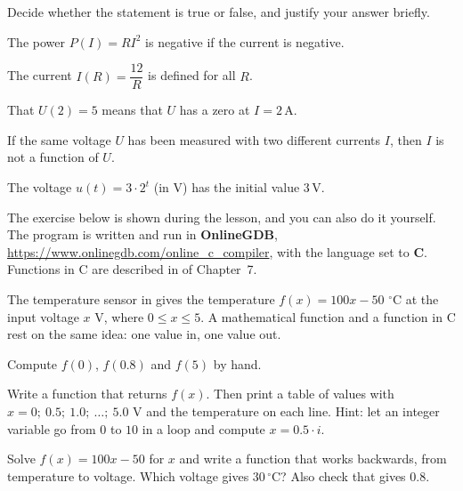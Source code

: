 Decide whether the statement is true or false, and justify your answer briefly.
\begin{parts}
  \item The power $P(I) = RI^2$ is negative if the current is negative.
  \item The current $I(R) = \dfrac{12}{R}$ is defined for all $R$.
  \item That $U(2) = 5$ means that $U$ has a zero at $I = 2\,\text{A}$.
  \item If the same voltage $U$ has been measured with two different currents $I$, then $I$ is not a
    function of $U$.
  \item The voltage $u(t) = 3 \cdot 2^t$ (in V) has the initial value $3\,\text{V}$.
\end{parts}

The exercise below is shown during the lesson, and you can also do it yourself. The program is
written and run in \textbf{OnlineGDB}, \url{https://www.onlinegdb.com/online_c_compiler}, with the
language set to \textbf{C}. Functions in C are described in  of Chapter~7.

The temperature sensor in  gives the temperature $f(x) = 100x - 50$
$^{\circ}$C at the input voltage $x$ V, where $0 \leq x \leq 5$. A mathematical function and a
function in C rest on the same idea: one value in, one value out.
\begin{parts}
  \item Compute $f(0)$, $f(0.8)$ and $f(5)$ by hand.
  \item Write a function  that returns $f(x)$. Then print
    a table of values with $x = 0;\ 0.5;\ 1.0;\ \ldots;\ 5.0$ V and the temperature on each line.
    Hint: let an integer variable  go from $0$ to $10$ in a loop and compute
    $x = 0.5 \cdot i$.
  \item Solve $f(x) = 100x - 50$ for $x$ and write a function
     that works backwards, from temperature to voltage.
    Which voltage gives $30\,^{\circ}$C? Also check that  gives
    $0.8$.
\end{parts}
